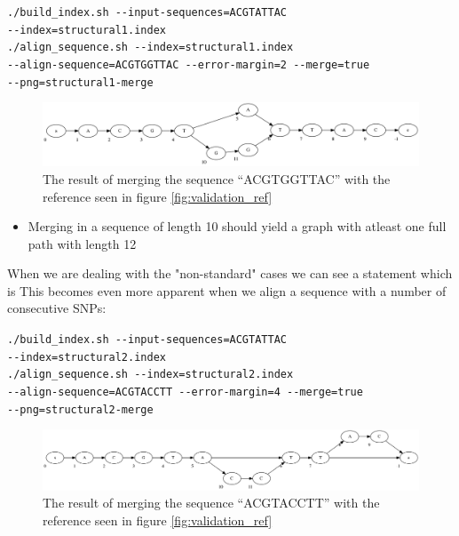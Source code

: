 \documentclass[thesis.tex]{subfiles}
\begin{document}
\par\noindent
\texttt{./build\_index.sh -{}-input-sequences=ACGTATTAC \\
-{}-index=structural1.index}\\
\texttt{./align\_sequence.sh -{}-index=structural1.index \\
-{}-align-sequence=ACGTGGTTAC -{}-error-margin=2 -{}-merge=true \\
-{}-png=structural1-merge}\\
\begin{figure}[H]
  \begin{mdframed}
  \includegraphics[width=\textwidth]{output/structural1-merge.png}
  \caption[Aligning and merging a complex variation with \ref{fig:validation_ref}]{The result of merging the sequence ``ACGTGGTTAC'' with the reference seen in figure \ref{fig:validation_ref}}
  \end{mdframed}
\end{figure}
\noindent
\begin{itemize}
  \item Merging in a sequence of length 10 should yield a graph with atleast one full path with length 12
\end{itemize}
When we are dealing with the "non-standard" cases we can see a statement which is  This becomes even more apparent when we align a sequence with a number of consecutive SNPs:\\
\par\noindent
\texttt{./build\_index.sh -{}-input-sequences=ACGTATTAC \\
-{}-index=structural2.index}\\
\texttt{./align\_sequence.sh -{}-index=structural2.index \\
-{}-align-sequence=ACGTACCTT -{}-error-margin=4 -{}-merge=true \\
-{}-png=structural2-merge}\\
\begin{figure}[H]
  \begin{mdframed}
  \includegraphics[width=\textwidth]{output/structural2-merge.png}
  \end{mdframed}
  \caption[Aligning and merging a second complex variation with \ref{fig:validation_ref}]{The result of merging the sequence ``ACGTACCTT'' with the reference seen in figure \ref{fig:validation_ref}}
\end{figure}
\end{document}
